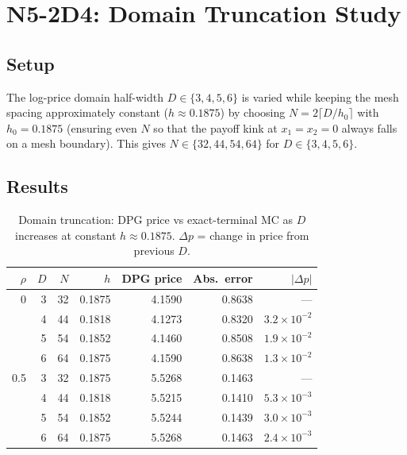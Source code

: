 \documentclass[11pt,a4paper]{article}
\begin{document}
\section{N5-2D4: Domain Truncation Study}
\label{sec:trunc}

\subsection{Setup}

The log-price domain half-width $D\in\{3,4,5,6\}$ is varied while keeping the
mesh spacing approximately constant ($h\approx 0.1875$) by choosing
$N=2\lceil D/h_0\rceil$ with $h_0=0.1875$ (ensuring even $N$ so that the
payoff kink at $x_1=x_2=0$ always falls on a mesh boundary).
This gives $N\in\{32,44,54,64\}$ for $D\in\{3,4,5,6\}$.

\subsection{Results}

\begin{table}[htbp]
\centering
\caption{Domain truncation: DPG price vs exact-terminal MC as $D$ increases
  at constant $h\approx0.1875$.  $\Delta p$ = change in price from previous $D$.}
\label{tab:trunc}
\small
\begin{tabular}{r r r r r r r}
\toprule
$\rho$ & $D$ & $N$ & $h$ & DPG price & Abs.\ error & $|\Delta p|$ \\
\midrule
0   & 3 & 32 & 0.1875 & 4.1590 & 0.8638 & --- \\
    & 4 & 44 & 0.1818 & 4.1273 & 0.8320 & $3.2\times10^{-2}$ \\
    & 5 & 54 & 0.1852 & 4.1460 & 0.8508 & $1.9\times10^{-2}$ \\
    & 6 & 64 & 0.1875 & 4.1590 & 0.8638 & $1.3\times10^{-2}$ \\
\midrule
0.5 & 3 & 32 & 0.1875 & 5.5268 & 0.1463 & --- \\
    & 4 & 44 & 0.1818 & 5.5215 & 0.1410 & $5.3\times10^{-3}$ \\
    & 5 & 54 & 0.1852 & 5.5244 & 0.1439 & $3.0\times10^{-3}$ \\
    & 6 & 64 & 0.1875 & 5.5268 & 0.1463 & $2.4\times10^{-3}$ \\
\bottomrule
\end{tabular}
\end{table}
\end{document}
